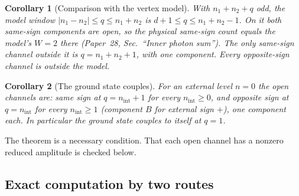 \documentclass[11pt]{article}
\newtheorem{corollary}{Corollary}
\begin{document}
\begin{corollary}[Comparison with the vertex model]
\label{cor:model_comparison}
With $n_1 + n_2 + q$ odd, the model window
$|n_1 - n_2| \le q \le n_1 + n_2$ is $d + 1 \le q \le n_1 + n_2 - 1$.  On
it both same-sign components are open, so the physical same-sign count
equals the model's $W = 2$ there (Paper~28, Sec.~``Inner photon sum'').
The only same-sign channel outside it is $q = n_1 + n_2 + 1$, with one
component.  Every opposite-sign channel is outside the model.
\end{corollary}

\begin{corollary}[The ground state couples]
\label{cor:ground_state}
For an external level $n = 0$ the open channels are: same sign at
$q = n_{\mathrm{int}} + 1$ for every $n_{\mathrm{int}} \ge 0$, and
opposite sign at $q = n_{\mathrm{int}}$ for every $n_{\mathrm{int}} \ge 1$
(component $B$ for external sign $+$), one component each.  In
particular the ground state couples to itself at $q = 1$.
\end{corollary}

The theorem is a necessary condition.  That each open channel has a
nonzero reduced amplitude is checked below.

\subsection{Exact computation by two routes}
\end{document}
